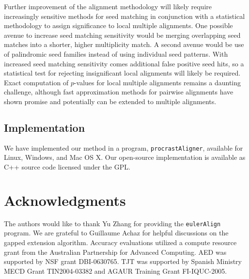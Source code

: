 \documentclass{ws-procs975x65}
\begin{document}
Further improvement of the alignment methodology will likely require increasingly sensitive methods for seed matching in conjunction with a statistical methodology to assign significance to local multiple alignments.  One possible avenue to increase seed matching sensitivity would be merging overlapping seed matches into a shorter, higher multiplicity match.  A second avenue would be use of palindromic seed families instead of using individual seed patterns. With increased seed matching sensitivity comes additional false positive seed hits, so a statistical test for rejecting insignificant local alignments will likely be required.  Exact computation of $p$-values for local multiple alignments remains a daunting challenge, although fast approximation methods for pairwise alignments have shown promise\cite{repseek} and potentially can be extended to multiple alignments\cite{ref-related1}.

\subsection{Implementation}
We have implemented our method in a program, \texttt{procrastAligner}, available for Linux, Windows, and Mac OS X. Our open-source implementation is available as C++ source code licensed under the GPL.

\section{ Acknowledgments }
The authors would like to thank Yu Zhang for providing the \texttt{eulerAlign} program. We are grateful to Guillaume Achaz for helpful discussions on the gapped extension algorithm. Accuracy evaluations utilized a compute resource grant from the Australian Partnership for Advanced Computing.  AED was supported by NSF grant DBI-0630765. TJT was
supported by Spanish Ministry MECD Grant TIN2004-03382 and AGAUR
Training Grant FI-IQUC-2005.




\end{document}
